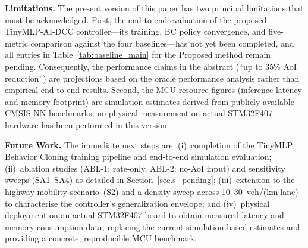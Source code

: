 \documentclass[journal]{IEEEtran}
\begin{document}
\textbf{Limitations.}  The present version of this paper has two
principal limitations that must be acknowledged.  First, the
end-to-end evaluation of the proposed TinyMLP-AI-DCC controller---its
training, BC policy convergence, and five-metric comparison against
the four baselines---has not yet been completed, and all entries in
Table~\ref{tab:baseline_main} for the Proposed method remain pending.
Consequently, the performance claims in the abstract (``up to 35\%
AoI reduction'') are projections based on the oracle performance
analysis rather than empirical end-to-end results.  Second, the MCU
resource figures (inference latency and memory footprint) are
simulation estimates derived from publicly available CMSIS-NN
benchmarks; no physical measurement on actual STM32F407 hardware has
been performed in this version.

\textbf{Future Work.}
The immediate next steps are: (i)~completion of the TinyMLP Behavior
Cloning training pipeline and end-to-end simulation evaluation;
(ii)~ablation studies (ABL-1: rate-only, ABL-2: no-AoI input) and
sensitivity sweeps (SA1--SA4) as detailed in
Section~\ref{sec.s_pending}; (iii)~extension to the highway mobility
scenario~(S2) and a density sweep across 10--30~veh/(km$\cdot$lane)
to characterise the controller's generalization envelope; and
(iv)~physical deployment on an actual STM32F407 board to obtain
measured latency and memory consumption data, replacing the current
simulation-based estimates and providing a concrete, reproducible MCU
benchmark.
\end{document}
